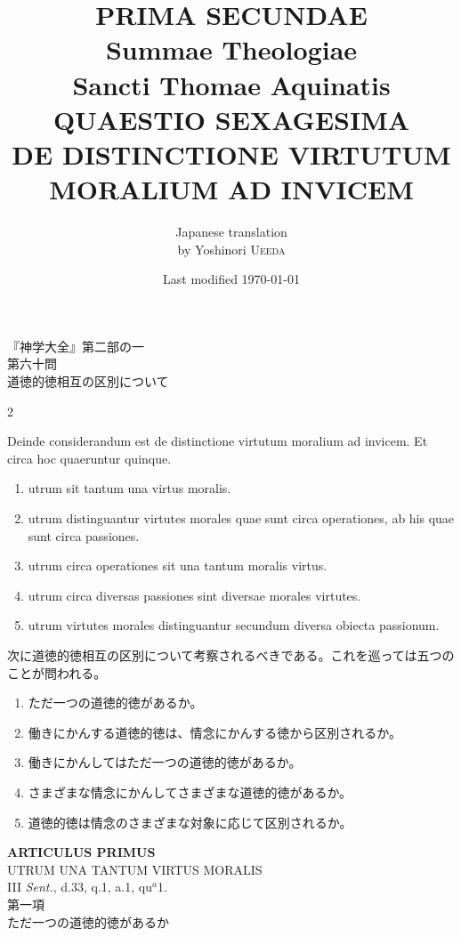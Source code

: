\documentclass[paper=a4paper,fontsize=10pt,jafontsize=9pt,titlepage]{jlreq}
\title{{\bfseries PRIMA SECUNDAE}\\{\Huge Summae Theologiae}\\Sancti Thomae
Aquinatis\\{\sffamily QUAESTIO SEXAGESIMA}\\DE DISTINCTIONE VIRTUTUM MORALIUM AD INVICEM}
\author{Japanese translation\\by Yoshinori {\scshape Ueeda}}
\date{Last modified \today}
\begin{document}
\maketitle
\thispagestyle{empty}

\begin{center}
{\LARGE 『神学大全』第二部の一}\\
{\Large 第六十問\\道徳的徳相互の区別について}
\end{center}

\begin{paracol}{2}

Deinde considerandum est de distinctione virtutum moralium ad
invicem. Et circa hoc quaeruntur quinque.
  
\begin{enumerate}
 \item utrum sit tantum una virtus moralis.
 \item utrum distinguantur virtutes morales quae sunt circa operationes, ab his quae sunt circa passiones.
 \item utrum circa operationes sit una tantum moralis virtus.
 \item utrum circa diversas passiones sint diversae morales virtutes.
 \item utrum virtutes morales distinguantur secundum diversa obiecta passionum.
\end{enumerate}

\switchcolumn

次に道徳的徳相互の区別について考察されるべきである。これを巡っては五つのことが問われる。

\begin{enumerate}
 \item ただ一つの道徳的徳があるか。
 \item 働きにかんする道徳的徳は、情念にかんする徳から区別されるか。
 \item 働きにかんしてはただ一つの道徳的徳があるか。
 \item さまざまな情念にかんしてさまざまな道徳的徳があるか。
 \item 道徳的徳は情念のさまざまな対象に応じて区別されるか。
\end{enumerate}

\end{paracol}
\newpage
{}
{}
\setcounter{section}{1}
\setcounter{subsection}{0}


\begin{center}
{\Large {\bfseries ARTICULUS PRIMUS}}\\
{\large UTRUM UNA TANTUM VIRTUS MORALIS}\\
{\footnotesize III {\itshape Sent.}, d.33, q.1, a.1, qu$^{a}$1.}\\
{\Large 第一項\\ただ一つの道徳的徳があるか}
\end{center}
\end{document}
